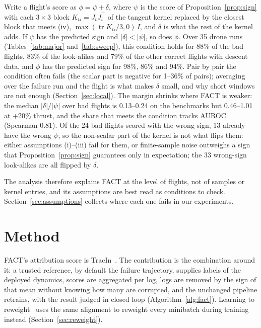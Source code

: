\documentclass[preprint,12pt]{elsarticle}
\newcommand{\method}{FACT}
\begin{document}
Write a flight's score as $\phi=\psi+\delta$, where $\psi$ is the score of Proposition~\ref{prop:sign} with each $3\times3$ block $K_{ti}=J_tJ_i^\top$ of the tangent kernel replaced by the closest block that meets (iv), $\max(\operatorname{tr}K_{ti}/3,0)\,I$, and $\delta$ is what the rest of the kernel adds. If $\psi$ has the predicted sign and $|\delta|<|\psi|$, so does $\phi$. Over 35 drone runs (Tables~\ref{tab:major} and~\ref{tab:sweep}), this condition holds for 88\% of the bad flights, 83\% of the look-alikes and 79\% of the other correct flights with descent data, and $\phi$ has the predicted sign for 98\%, 86\% and 94\%. Pair by pair the condition often fails (the scalar part is negative for 1--36\% of pairs); averaging over the failure run and the flight is what makes $\delta$ small, and why short windows are not enough (Section~\ref{sec:local}). The margin shrinks where \method{} is weaker: the median $|\delta|/|\psi|$ over bad flights is 0.13--0.24 on the benchmarks but 0.46--1.01 at +20\% thrust, and the share that meets the condition tracks AUROC (Spearman 0.81). Of the 24 bad flights scored with the wrong sign, 13 already have the wrong $\psi$, so the non-scalar part of the kernel is not what flips them: either assumptions (i)--(iii) fail for them, or finite-sample noise outweighs a sign that Proposition~\ref{prop:sign} guarantees only in expectation; the 33 wrong-sign look-alikes are all flipped by $\delta$.

The analysis therefore explains \method{} at the level of flights, not of samples or kernel entries, and its assumptions are best read as conditions to check. Section~\ref{sec:assumptions} collects where each one fails in our experiments.

\section{Method}\label{sec:method}

\method{}'s attribution score is TracIn~\citep{pruthi2020tracin}. The contribution is the combination around it: a trusted reference, by default the failure trajectory, supplies labels of the deployed dynamics, scores are aggregated per log, logs are removed by the sign of that mean without knowing how many are corrupted, and the unchanged pipeline retrains, with the result judged in closed loop (Algorithm~\ref{alg:fact}). Learning to reweight~\citep{ren2018l2rw} uses the same alignment to reweight every minibatch during training instead (Section~\ref{sec:reweight}).
\end{document}
